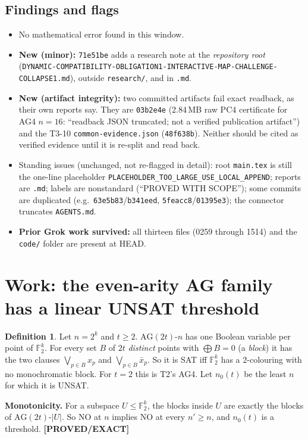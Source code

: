 \documentclass[11pt]{article}
\theoremstyle{definition}
\newtheorem{definition}{Definition}
\theoremstyle{remark}
\newcommand{\lab}[1]{\textbf{[#1]}}
\newcommand{\F}{\mathbb{F}}
\newcommand{\AG}{\mathrm{AG}}
\begin{document}
\subsection{Findings and flags}
\begin{itemize}
\item No mathematical error found in this window.
\item \textbf{New (minor):} \texttt{71e51be} adds a research note at the \emph{repository
root} (\texttt{DYNAMIC-COMPATIBILITY-OBLIGATION1-\allowbreak INTERACTIVE-MAP-CHALLENGE-COLLAPSE1.md}),
outside \texttt{research/}, and in \texttt{.md}.
\item \textbf{New (artifact integrity):} two committed artifacts fail exact readback, as their
own reports say. They are \texttt{03b2e4e} (2.84\,MB raw PC4 certificate for AG4 $n=16$:
``readback JSON truncated; not a verified publication artifact'') and the T3-10
\texttt{common-evidence.json} (\texttt{48f638b}). Neither should be cited as verified evidence
until it is re-split and read back.
\item Standing issues (unchanged, not re-flagged in detail): root \texttt{main.tex} is still
the one-line placeholder \texttt{PLACEHOLDER\_TOO\_LARGE\_USE\_LOCAL\_APPEND}; reports are
\texttt{.md}; labels are nonstandard (``PROVED WITH SCOPE''); some commits are duplicated
(e.g.\ \texttt{63e5b83}/\texttt{b341eed}, \texttt{5feacc8}/\texttt{01395e3}); the connector
truncates \texttt{AGENTS.md}.
\item \textbf{Prior Grok work survived:} all thirteen
 files (0259 through 1514) and the
\texttt{code/} folder are present at HEAD.
\end{itemize}

\section{Work: the even-arity AG family has a linear UNSAT threshold}\label{sec:work}
\begin{definition}
Let $n=2^k$ and $t\ge2$. $\AG(2t)$-$n$ has one Boolean variable per point of $\F_2^k$. For
every set $B$ of $2t$ \emph{distinct} points with $\bigoplus B=0$ (a \emph{block}) it has the
two clauses $\bigvee_{p\in B}x_p$ and $\bigvee_{p\in B}\bar x_p$. So it is SAT iff $\F_2^k$
has a 2-colouring with no monochromatic block. For $t=2$ this is T2's AG4. Let $n_0(t)$ be
the least $n$ for which it is UNSAT.
\end{definition}
\textbf{Monotonicity.} For a subspace $U\le\F_2^k$, the blocks inside $U$ are exactly the
blocks of $\AG(2t)$-$|U|$. So NO at $n$ implies NO at every $n'\ge n$, and $n_0(t)$ is a
threshold. \lab{PROVED/EXACT}
\end{document}
